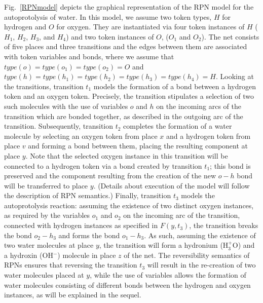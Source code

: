 \documentclass[runningheads]{llncs}
\newcommand{\type}{\mathit{type}}
\begin{document}
Fig.~\ref{RPNmodel} depicts the graphical representation of the RPN model for the autoprotolysis of water.
In this model, we assume two token types, $H$ for hydrogen
and $O$ for oxygen. They are instantiated via four token instances of $H$ ($H_1$, $H_2$, $H_3$, and $H_4$) and two token instances of
$O$, ($O_1$ and $O_2$). The net consists of five places and three transitions and the edges between
them are associated with token variables and bonds, where we assume that $\type(o)=\type(o_1)=\type(o_2) = O$
and $\type(h)=\type(h_1)=\type(h_2)=\type(h_3)=\type(h_4)=H$. 
Looking at the transitions, transition $t_1$ models the formation of a bond between a hydrogen
token and an oxygen token. Precisely, the transition stipulates a selection of two such
molecules with the use
of variables $o$ and $h$ on the incoming arcs of the transition which are bonded
together, as described in the outgoing arc of the transition.
Subsequently, transition $t_2$ completes
the formation of a water molecule by selecting an oxygen token from place $x$ and
a hydrogen token from place $v$ and forming a bond between them, placing the resulting component at place $y$. Note that the selected oxygen instance in this transition will be connected to a hydrogen token via a bond 
created by transition $t_1$; this bond is preserved and the component resulting from the creation of
the new $o-h$ bond will be transferred to place $y$. (Details about execution of the model will follow the
description of RPN semantics.)
Finally, transition $t_3$ models the autoprotolysis reaction: assuming the existence of two distinct oxygen
instances, as required by the variables $o_1$ and $o_2$ on the incoming arc of the transition, connected
with hydrogen instances as specified in $F(y,t_3)$, the transition breaks the bond $o_2-h_3$ and forms the
bond  $o_1-h_3$.  As such, assuming the existence of two water molecules at place $y$, the transition
will form  a hydronium  (H$_3^+$O) and a hydroxin (OH$^-$) molecule in place $z$ of the net.
The reversibility semantics of RPNs ensures that  reversing the transition $t_3$ will result in the re-creation
of  two water molecules placed at $y$, while the use of variables allows the formation of water molecules consisting
of different bonds between the hydrogen and oxygen instances, as will be explained in the sequel.
\end{document}
